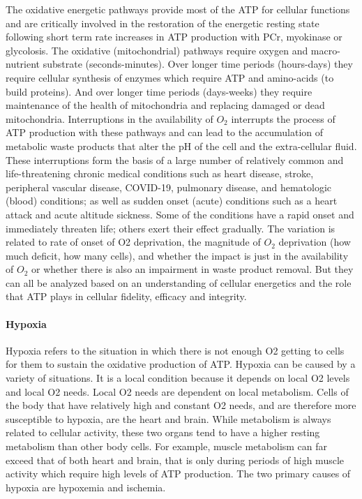 The oxidative energetic pathways provide most of the ATP for cellular functions and are critically involved in the restoration of the energetic resting state following short term rate increases in ATP production with PCr, myokinase or glycolosis. The oxidative (mitochondrial) pathways require oxygen and macro-nutrient substrate (seconds-minutes). Over longer time periods (hours-days) they require cellular synthesis of enzymes which require ATP and amino-acids (to build proteins). And over longer time periods (days-weeks) they require maintenance of the health of mitochondria and replacing damaged or dead mitochondria. Interruptions in the availability of $O_2$ interrupts the process of ATP production with these pathways and can lead to the accumulation of metabolic waste products that alter the pH of the cell and the extra-cellular fluid. These interruptions form the basis of a large number of relatively common and life-threatening chronic medical conditions such as heart disease, stroke, peripheral vascular disease, COVID-19, pulmonary disease, and hematologic (blood) conditions; as well as sudden onset (acute) conditions such as a heart attack and acute altitude sickness. 
Some of the conditions have a rapid onset and immediately threaten life; others exert their effect gradually. The variation is related to rate of onset of O2 deprivation, the magnitude of $O_2$ deprivation (how much deficit, how many cells), and whether the impact is just in the availability of $O_2$ or whether there is also an impairment in waste product removal. But they can all be analyzed based on an understanding of cellular energetics and the role that ATP plays in cellular fidelity, efficacy and integrity.

\paragraph{Hypoxia}
Hypoxia refers to the situation in which there is not enough O2 getting to cells for them to sustain the oxidative production of ATP. Hypoxia can be caused by a variety of situations. It is a local condition because it depends on local O2 levels and local O2 needs. Local O2 needs are dependent on local metabolism. Cells of the body that have relatively high and constant O2 needs, and are therefore more susceptible to hypoxia, are the heart and brain. While metabolism is always related to cellular activity, these two organs tend to have a higher resting metabolism than other body cells. For example, muscle metabolism can far exceed that of both heart and brain, that is only during periods of high muscle activity which require high levels of ATP production. 
The two primary causes of hypoxia are hypoxemia and ischemia.

